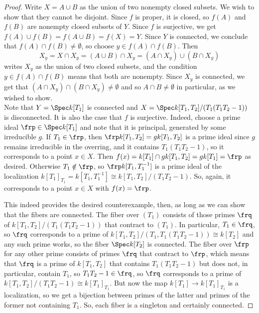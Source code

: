 \begin{proof}
	Write $X = A \cup B$ as the union of two nonempty closed subsets. We wish to show that they cannot be disjoint. Since $f$ is proper, it is closed, so $f(A)$ and $f(B)$ are nonempty closed subsets of $Y$. Since $f$ is surjective, we get $f(A) \cup f(B) = f(A \cup B) = f(X) = Y$. Since $Y$ is connected, we conclude that $f(A) \cap f(B) \neq \emptyset$, so choose $y \in f(A) \cap f(B)$. Then
	\[ X_y = X \cap X_y = (A \cup B) \cap X_y = (A \cap X_y) \cup (B \cap X_y) \]
	writes $X_y$ as the union of two closed subsets, and the condition $y \in f(A) \cap f(B)$ means that both are nonempty. Since $X_y$ is connected, we get that $(A \cap X_y) \cap (B \cap X_y) \neq \emptyset$ and so $A \cap B \neq \emptyset$ in particular, as we wished to show. \\
	
	Note that $Y = \Spec k[T_1]$ is connected and $X = \Spec k[T_1,T_2]/(T_1(T_1T_2-1))$ is disconnected. It is also the case that $f$ is surjective. Indeed, choose a prime ideal $\frp \in \Spec k[T_1]$ and note that it is principal, generated by some irreducible $g$. If $T_1 \in \frp$, then $\frp k[T_1,T_2] = gk[T_1,T_2]$ is a prime ideal since $g$ remains irreducible in the overring, and it contains $T_1(T_1T_2-1)$, so it corresponds to a point $x \in X$. Then $f(x) = k[T_1] \cap gk[T_1,T_2] = gk[T_1] = \frp$ as desired. Otherwise $T_1 \notin \frp$, so $\frp k[T_1,T_1^{-1}]$ is a prime ideal of the localization $k[T_1]_{T_1} = k[T_1,T_1^{-1}] \cong k[T_1,T_2]/(T_1T_2-1)$. So, again, it corresponds to a point $x \in X$ with $f(x) = \frp$.
	
	This indeed provides the desired counterexample, then, as long as we can show that the fibers are connected. The fiber over $(T_1)$ consists of those primes $\frq$ of $k[T_1,T_2]/(T_1(T_1T_2-1))$ that contract to $(T_1)$. In particular, $T_1 \in \frq$, so $\frq$ corresponds to a prime of $k[T_1,T_2]/(T_1,T_1(T_1T_2-1)) \cong k[T_2]$ and any such prime works, so the fiber $\Spec k[T_2]$ is connected. The fiber over $\frp$ for any other prime consists of primes $\frq$ that contract to $\frp$, which means that $\frq$ is a prime of $k[T_1,T_2]$ that contains $T_1(T_1T_2-1)$ but does not, in particular, contain $T_1$, so $T_1T_2-1 \in \frq$, so $\frq$ corresponds to a prime of $k[T_1,T_2]/(T_1T_2-1) \cong k[T_1]_{T_1}$. But now the map $k[T_1] \to k[T_1]_{T_1}$ is a localization, so we get a bijection between primes of the latter and primes of the former not containing $T_1$. So, each fiber is a singleton and certainly connected. 
\end{proof}
